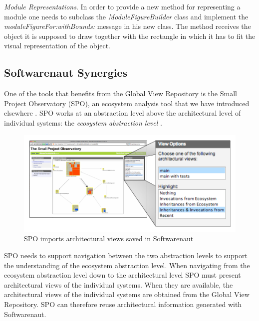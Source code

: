 \documentclass[preprint,12pt]{elsarticle}
\newcommand{\cd}[1]{{\em{#1}}}
\begin{document}
\begin{description}
\item {\em Module Representations}. In order to provide a new method for representing a module one needs to subclass the \cd{ModuleFigureBuilder} class and implement the \cd{moduleFigureFor:withBounds:} message in his new class. The method receives the object it is supposed to draw together with the rectangle in which it has to fit the visual representation of the object.

\end{description} 


\subsection {Softwarenaut Synergies}

One of the tools that benefits from the Global View Repository is the Small Project Observatory (SPO), an ecosystem analysis tool that we have introduced elsewhere \cite{lungu-est}. SPO works at an abstraction level above the architectural level of individual systems: the {\em ecosystem abstraction level} \cite{lungu-thesis}. 

\begin{figure}[ht]
\begin{center}
\includegraphics[width=\linewidth]{SpoArchitectural}
\caption{SPO imports architectural views saved in Softwarenaut}
\label{}
\end{center}
\end{figure}

SPO needs to support navigation between the two abstraction levels to support the understanding of  the ecosystem abstraction level. When navigating from the ecosystem abstraction level down to the architectural level SPO must present architectural views of the individual systems. When they are available, the architectural views of the individual systems are obtained from the Global View Repository. SPO can therefore reuse architectural information generated with Softwarenaut.
\end{document}
